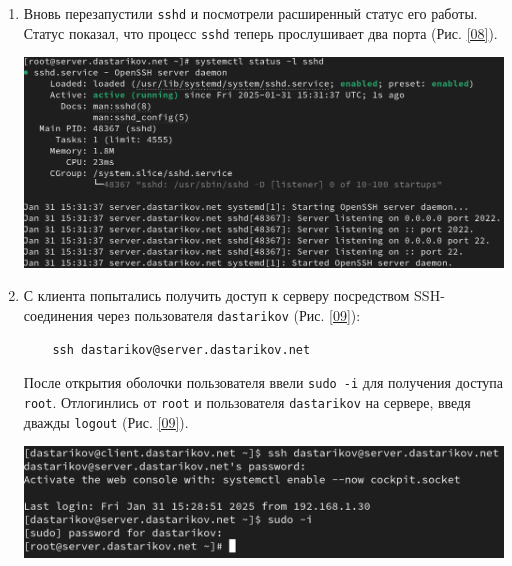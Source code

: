 \begin{enumerate}
\item Вновь перезапустили \texttt{sshd} и посмотрели расширенный статус его работы. Статус показал, что процесс \texttt{sshd} теперь прослушивает два порта (Рис. \ref{08}).
\begin{center}
  \centering
  \includegraphics[width=\textwidth]{../images/image08.png}
  \label{08}
\end{center}

\item С клиента попытались получить доступ к серверу посредством SSH-соединения через пользователя \texttt{dastarikov} (Рис. \ref{09}):
  \begin{verbatim}
    ssh dastarikov@server.dastarikov.net
  \end{verbatim}
  После открытия оболочки пользователя ввели \texttt{sudo -i} для получения доступа \texttt{root}. Отлогинлись от \texttt{root} и пользователя \texttt{dastarikov} на сервере, введя дважды \texttt{logout}  (Рис. \ref{09}).
\begin{center}
  \centering
  \includegraphics[width=\textwidth]{../images/image09.png}
  \label{09}
\end{center}


\end{enumerate}
